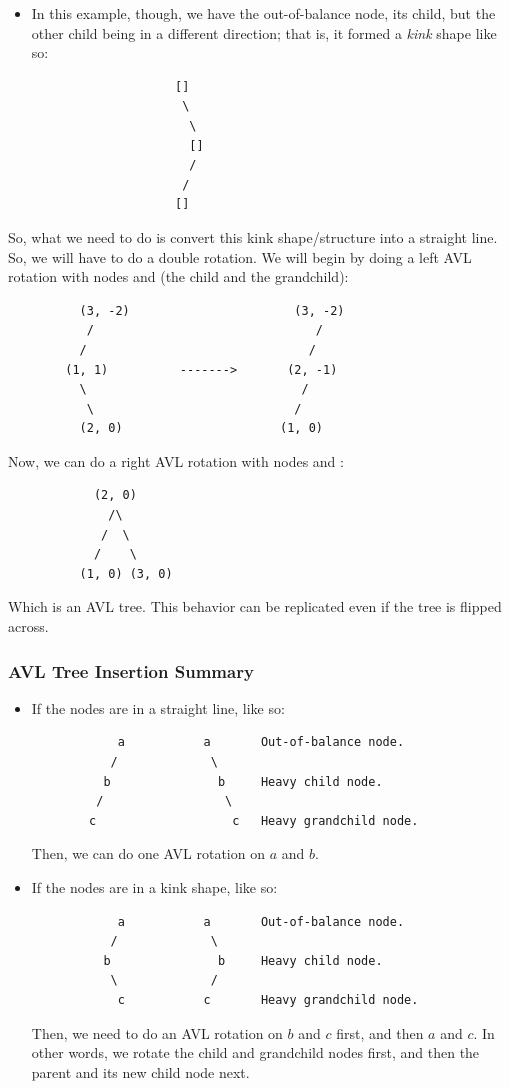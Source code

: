 \documentclass[letterpaper]{article}
\begin{document}
\begin{enumerate}[(1)]
\begin{itemize}
        \item In this example, though, we have the out-of-balance node, its child, but the other child being in a different direction; that is, it formed a \emph{kink} shape like so: 
        \begin{verbatim}
                    []
                     \ 
                      \ 
                      []
                      /
                     /
                    []
        \end{verbatim}
    \end{itemize}
    So, what we need to do is convert this kink shape/structure into a straight line. So, we will have to do a double rotation. We will begin by doing a left AVL rotation with nodes  and  (the child and the grandchild): 
    \begin{verbatim}
          (3, -2)                       (3, -2)
           /                               /
          /                               /
        (1, 1)          ------->       (2, -1)
          \                              /
           \                            /
          (2, 0)                      (1, 0)
    \end{verbatim}
    Now, we can do a right AVL rotation with nodes  and :
    \begin{verbatim}
            (2, 0)
              /\ 
             /  \ 
            /    \
          (1, 0) (3, 0)
    \end{verbatim}
    Which is an AVL tree. This behavior can be replicated even if the tree is flipped across. 
\end{enumerate}

\subsubsection{AVL Tree Insertion Summary}
\begin{itemize}
    \item If the nodes are in a straight line, like so: 
    \begin{verbatim}
            a           a       Out-of-balance node. 
           /             \ 
          b               b     Heavy child node. 
         /                 \ 
        c                   c   Heavy grandchild node. 
    \end{verbatim}
    Then, we can do one AVL rotation on $a$ and $b$.
    \item If the nodes are in a kink shape, like so: 
    \begin{verbatim}
            a           a       Out-of-balance node. 
           /             \
          b               b     Heavy child node. 
           \             /
            c           c       Heavy grandchild node.
    \end{verbatim}
    Then, we need to do an AVL rotation on $b$ and $c$ first, and then $a$ and $c$. In other words, we rotate the child and grandchild nodes first, and then the parent and its new child node next. 
\end{itemize}
\end{document}

